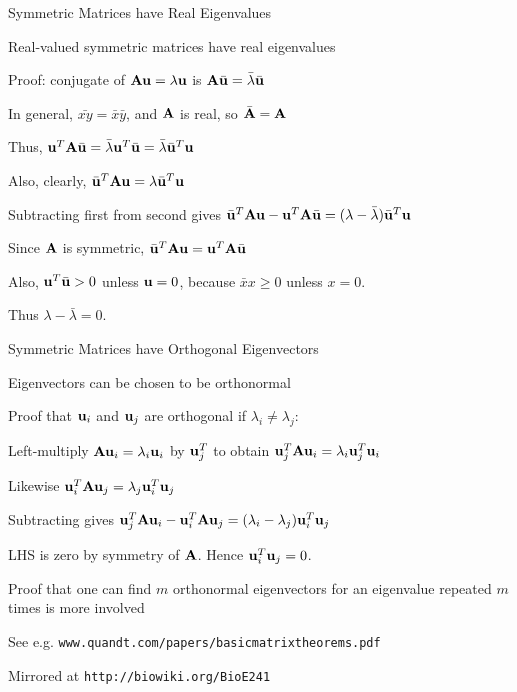 \documentclass{beamer}
\begin{document}
\begin{frame}{Symmetric Matrices have Real Eigenvalues}

 \itemb
 \item Real-valued symmetric matrices have real eigenvalues
  \itemb
  \item Proof: conjugate of ${\bf Au} = \lambda{\bf u}$ is ${\bf A}\bar{\bf u} = \bar{\lambda}\bar{\bf u}$
   \itemb
   \item In general, $\bar{xy} = \bar{x} \bar{y}$, and ${\bf A}$ is real, so $\bar{\bf A} = {\bf A}$
   \iteme
  \item Thus, ${\bf u}^T{\bf A}\bar{\bf u} = \bar{\lambda} {\bf u}^T \bar{\bf u} = \bar{\lambda} \bar{\bf u}^T {\bf u}$
  \item Also, clearly, $\bar{\bf u}^T{\bf Au} = \lambda\bar{\bf u}^T{\bf u}$
  \item Subtracting first from second gives $\bar{\bf u}^T{\bf Au} - {\bf u}^T{\bf A}\bar{\bf u} = (\lambda - \bar{\lambda})\bar{\bf u}^T{\bf u}$
  \item Since ${\bf A}$ is symmetric, $\bar{\bf u}^T{\bf A}{\bf u} = {\bf u}^T{\bf A}\bar{\bf u}$
  \item Also, ${\bf u}^T\bar{\bf u} > 0$ unless ${\bf u}=0$, because $\bar{x}x \geq 0$ unless $x=0$.
  \item Thus $\lambda-\bar{\lambda}=0$.
 \iteme
\iteme

\end{frame}

\begin{frame}{Symmetric Matrices have Orthogonal Eigenvectors}

\itemb
 \item Eigenvectors can be chosen to be orthonormal
 \itemb
  \item Proof that ${\bf u}_i$ and ${\bf u}_j$ are orthogonal if $\lambda_i \neq \lambda_j$:
  \item Left-multiply ${\bf Au}_i = \lambda_i {\bf u}_i$ by ${\bf u}^T_j$ to obtain ${\bf u}^T_j{\bf Au}_i = \lambda_i {\bf u}^T_j{\bf u}_i$
  \item Likewise ${\bf u}^T_i{\bf Au}_j = \lambda_j {\bf u}^T_i{\bf u}_j$
  \item Subtracting gives ${\bf u}^T_j{\bf Au}_i - {\bf u}^T_i{\bf Au}_j = (\lambda_i - \lambda_j) {\bf u}^T_i{\bf u}_j$
  \item LHS is zero by symmetry of ${\bf A}$. Hence ${\bf u}^T_i{\bf u}_j = 0$.
  \item Proof that one can find $m$ orthonormal eigenvectors for an eigenvalue repeated $m$ times is more involved
   \itemb
   \item See e.g. {\tt www.quandt.com/papers/basicmatrixtheorems.pdf}
   \item Mirrored at {\tt http://biowiki.org/BioE241}
   \iteme
  \iteme
\iteme

\end{frame}
\end{document}
